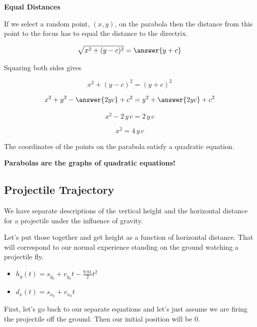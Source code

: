 \documentclass{ximera}
\begin{document}
\begin{idea} \textbf{\textcolor{blue!55!black}{Equal Distances}}


If we select a random point, $(x,y)$, on the parabola then the distance from this point to the focus has to equal the distance to the directrix.


\[  \sqrt{x^2 + (y-c)^2} = \answer{y+c}   \]


Squaring both sides gives


\[  x^2 + (y-c)^2 = (y+c)^2   \]

\[  x^2 + y^2 - \answer{2 y c} + c^2 = y^2 + \answer{2 y c} + c^2   \]

\[  x^2  - 2 \, y \, c  =  2 \, y \, c    \]

\[  x^2   =  4 \, y \, c    \]


The coordinates of the points on the parabola satisfy a quadratic equation.  


\begin{center}
\textbf{\textcolor{red!70!black}{Parabolas are the graphs of quadratic equations!}}
\end{center}


\end{idea}








\subsection*{Projectile Trajectory}


We have separate descriptions of the vertical height and the horizontal distance for a projectile under the influence of gravity.  

Let's put those together and get height as a function of horizontal distance.  That will correspond to our normal experience standing on the ground watching a projectile fly.


\begin{itemize}
\item $h_y(t) = s_{y_0} + v_{y_0} t - \frac{9.81}{2} t^2$


\item $d_x(t) = s_{x_0} + v_{x_0} t$
\end{itemize}




First, let's go back to our separate equations and let's just assume we are firing the projectile off the ground.  Then our initial position will be $0$.  
\end{document}
